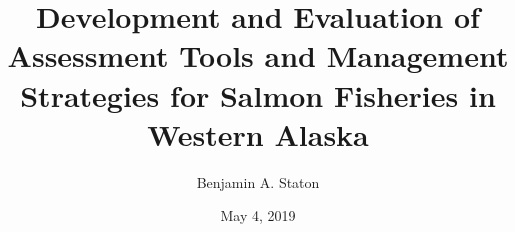 

\usepackage{auphd}     %

\usepackage[normalem]{ulem}       %
\usepackage{url}
\usepackage[table]{xcolor}
\usepackage{tikz}
\usepackage{pgf}
\usepackage{soul}
\usepackage{float}
\usepackage{booktabs}
\usepackage{amsmath,amsthm, amsfonts, mathrsfs, graphicx, setspace, fullpage, color}
\usepackage{natbib, appendix}
\usepackage[T1]{fontenc}
\usepackage{multirow}
\RequirePackage{adjustbox}
\usepackage{hyperref}

\usepackage[hang,flushmargin]{footmisc}


\usepackage{caption}
\captionsetup{width=\textwidth}
\captionsetup[figure]{labelfont=sc}
\captionsetup[table]{labelfont=sc}


\usepackage{pdflscape}


\makeatother
\let\oldmaketitle\maketitle
\AtBeginDocument{\let\maketitle\relax}

\title{Development and Evaluation of Assessment Tools and Management Strategies for Salmon Fisheries in Western Alaska}
\author{Benjamin A. Staton} 
\date{May 4, 2019} %

